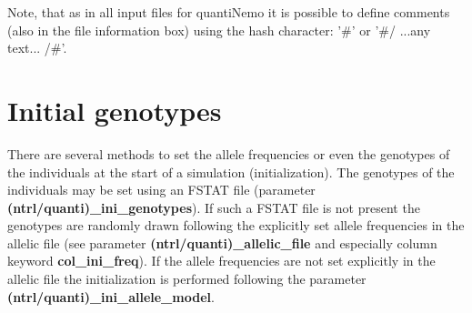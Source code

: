 \documentclass[letterpaper,12pt,oneside]{book}
\begin{document}
\begin{description}
\begin{description}
\end{description} 
Note, that as in all input files for quantiNemo it is possible to define comments (also in the file information box) using the hash character: '\#' or '\#/ ...any text... /\#'.
\end{description}


\section{Initial genotypes}\label{iniGenoQuanti}
There are several methods to set the allele frequencies or even the genotypes of the individuals at the start of a simulation (initialization). The genotypes of the individuals may be set using an FSTAT file \citep{Goudet_1995} (parameter \textbf{(ntrl/quanti)\_ini\_genotypes}). If such a FSTAT file is not present the genotypes are randomly drawn following the explicitly set allele frequencies in the allelic file (see parameter \textbf{(ntrl/quanti)\_allelic\_file} and especially column keyword \textbf{col\_ini\_freq}). If the allele frequencies are not set explicitly in the allelic file the initialization is performed following the parameter \textbf{(ntrl/quanti)\_ini\_allele\_model}.  
\end{document}
